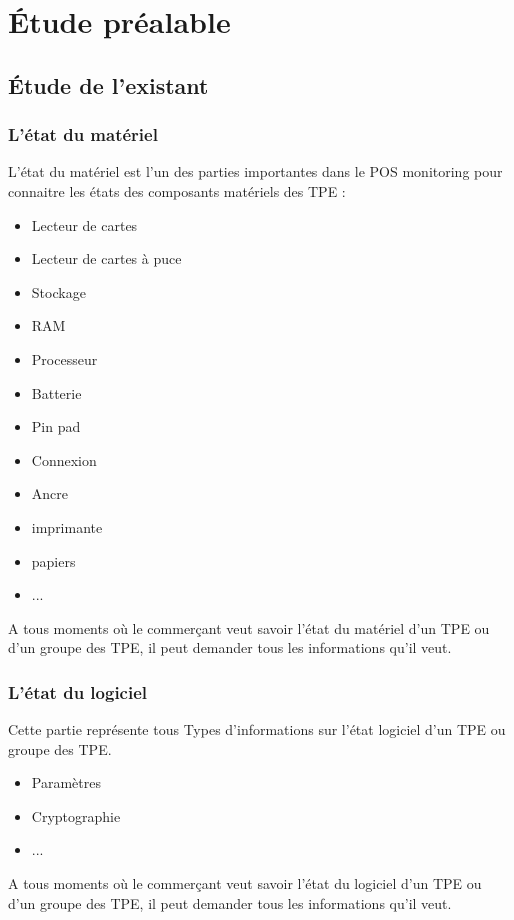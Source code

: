 \section{Étude préalable}
\subsection{Étude de l'existant}

\subsubsection{L'état du matériel}
L'état du matériel est l'un des parties importantes dans le POS monitoring pour connaitre les états des composants matériels des TPE :
\begin{itemize}[label=\textbullet]
\item  Lecteur de cartes
\item  Lecteur de cartes à puce
\item  Stockage
\item  RAM
\item  Processeur
\item  Batterie
\item  Pin pad
\item  Connexion
\item  Ancre
\item  imprimante
\item  papiers
\item  ...
\end{itemize}


A tous moments où le commerçant veut savoir l'état du matériel d'un TPE ou d'un groupe des TPE, il peut demander tous les informations qu'il veut.\\

\subsubsection{L'état du logiciel}
Cette partie représente tous Types d'informations sur l'état logiciel d'un TPE ou groupe des TPE.
\begin{itemize}[label=\textbullet]
\item  Paramètres 
\item  Cryptographie
\item  ...
\end{itemize}

A tous moments où le commerçant veut savoir l'état du logiciel d'un TPE ou d'un groupe des TPE, il peut demander tous les informations qu'il veut.\\



